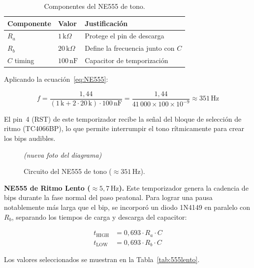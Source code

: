 \documentclass[12pt,onecolumn]{IEEEtran}
\begin{document}
\begin{table}[H]
\centering
\caption{Componentes del NE555 de tono.}
\label{tab:555tono}
\begin{tabular}{lll}
\toprule
\textbf{Componente} & \textbf{Valor} & \textbf{Justificación} \\
\midrule
$R_a$       & $1\,\text{k}\Omega$   & Protege el pin de descarga \\
$R_b$       & $20\,\text{k}\Omega$  & Define la frecuencia junto con $C$ \\
$C$ timing  & $100\,\text{nF}$      & Capacitor de temporización \\
\bottomrule
\end{tabular}
\end{table}

Aplicando la ecuación~\eqref{eq:NE555}:

\begin{equation}
    f = \frac{1{,}44}{(1\,\text{k} + 2\cdot 20\,\text{k})\cdot 100\,\text{nF}}
      = \frac{1{,}44}{41\,000 \times 100\times10^{-9}}
      \approx 351\,\text{Hz}
\end{equation}

El pin~4 (RST) de este temporizador recibe la señal del bloque de selección de ritmo (TC4066BP), lo que permite interrumpir el tono rítmicamente para crear los bips audibles.

\begin{figure}[H]
    \centering
    \begin{center}\textit{(nueva foto del diagrama)}\end{center}
    \caption{Circuito del NE555 de tono ($\approx 351\,\text{Hz}$).}
    \label{fig:tono}
\end{figure}

\textbf{NE555 de Ritmo Lento ($\approx 5{,}7\,\text{Hz}$).}
Este temporizador genera la cadencia de bips durante la fase normal del paso peatonal. Para lograr una pausa notablemente más larga que el bip, se incorporó un diodo 1N4149 en paralelo con $R_b$, separando los tiempos de carga y descarga del capacitor:

\begin{align}
    t_{\text{HIGH}} &= 0{,}693 \cdot R_a \cdot C \\
    t_{\text{LOW}}  &= 0{,}693 \cdot R_b \cdot C
\end{align}

Los valores seleccionados se muestran en la Tabla~\ref{tab:555lento}.
\end{document}
